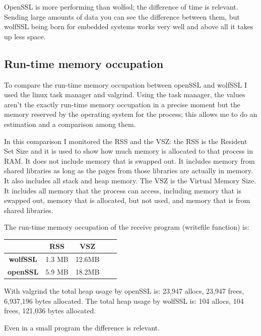 \documentclass[a4paper,12pt]{article}
\begin{document}
OpenSSL is more performing than wolfssl; the difference of time is relevant.
Sending large amounts of data you can see the difference between them, but wolfSSL being born for embedded systems works very well and above all it takes up less space.

\subsection{Run-time memory occupation}
To compare the run-time memory occupation between openSSL and wolfSSL I used the linux task manager and valgrind. Using the task manager, the values aren't the exactly run-time memory occupation in a precise moment but the memory reserved by the operating system for the process; this allows me to do an estimation and a comparison among them.

In this comparison I monitored the RSS and the VSZ:
the RSS is the Resident Set Size and it is used to show how much memory is allocated to that process in RAM. It does not include memory that is swapped out. It includes memory from shared libraries as long as the pages from those libraries are actually in memory. It also includes all stack and heap memory.
The VSZ is the Virtual Memory Size. It includes all memory that the process can access, including memory that is swapped out, memory that is allocated, but not used, and memory that is from shared libraries.

The run-time memory occupation of the receive program (writefile function) is:
\\
\begin{tabular}{ ||c|c|c|c|c|| } 
 \hline
 & RSS & VSZ\\ 
 \hline
 \textbf{wolfSSL} &1.3 MB& 12.6MB\\ 
 \hline
 \textbf{openSSL} &5.9 MB& 18.2MB\\ 
 \hline
\end{tabular}
\newline
\newline
With valgrind the total heap usage by openSSL is: 23,947 allocs, 23,947 frees, 6,937,196 bytes allocated.
The total heap usage by wolfSSL is: 104 allocs, 104 frees, 121,036 bytes allocated.

Even in a small program the difference is relevant.
\end{document}
